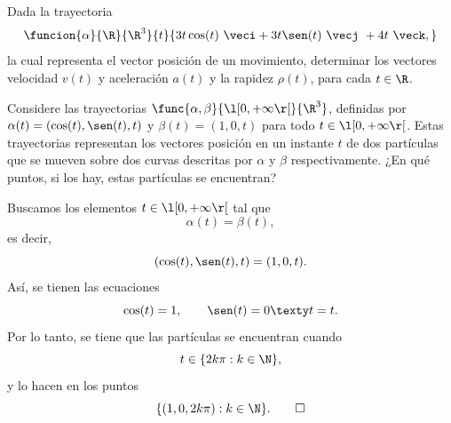 \documentclass[a4,11pt]{aleph-examen}
\begin{document}
\begin{preguntas}
\item
	Dada la trayectoria
    \[
    	\funcion{\alpha}{\R}{\R^3}{t}{3t\cos(t) \ \veci+3t\sen(t)\   \vecj\ + 4t\ \veck,}
    \]
    la cual representa el vector posición de un movimiento, determinar los vectores velocidad $v(t)$ y aceleración $a(t)$ y la rapidez $\rho(t)$, para cada $t\in\R$.
    


\item 
    Considere las trayectorias $\func{\alpha,\beta}{\l[0,+\infty\r[}{\R^3}$, definidas por $\alpha(t)=(\cos(t),\sen(t),t)$ y $\beta(t)=(1,0,t)$ para todo $t\in\l[0,+\infty\r[$. Estas trayectorias representan los vectores posición en un instante $t$ de dos partículas que se mueven sobre dos curvas descritas por $\alpha$ y $\beta$ respectivamente. ¿En qué puntos, si los hay, estas partículas se encuentran? 

\begin{respuesta}
    Buscamos los elementos $t\in \l[0,+\infty\r[$ tal que
    \[
        \alpha(t)=\beta(t),
    \]
    es decir,
    \[
       (\cos(t),\sen(t),t)=(1,0,t).
    \]
    Así, se tienen las ecuaciones
    \[
        \cos(t)=1,
        \qquad
        \sen(t)=0
        \texty
        t=t.
    \]
    Por lo tanto, se tiene que las partículas se encuentran cuando
    \[
        t\in\{2k\pi:k\in\N\},
    \]
    y lo hacen en los puntos 
    \[
        \{(1,0,2k\pi):k\in\N\}.\qedhere
    \]
\end{respuesta}


\end{preguntas}
\end{document}
